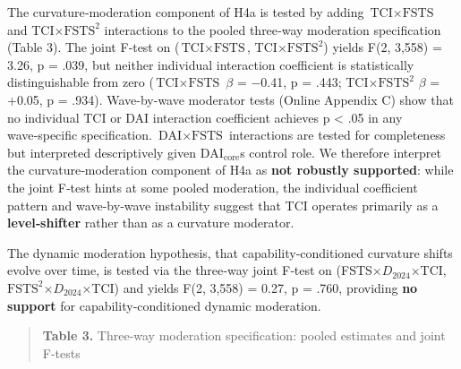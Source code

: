 \documentclass[12pt,a4paper]{article}
\begin{document}
The curvature‑moderation component of H4a is tested by adding
\(\text{TCI} \times \text{FSTS}\) and TCI\(\times\)\(\mathrm{FSTS}^2\)
interactions to the pooled three‑way moderation specification (Table 3).
The joint F‑test on (\(\text{TCI} \times \text{FSTS}\),
TCI\(\times\)\(\mathrm{FSTS}^2\)) yields F(2, 3,558) = 3.26, p = .039,
but neither individual interaction coefficient is statistically
distinguishable from zero (\(\text{TCI} \times \text{FSTS}\) \(\beta\) =
−0.41, p = .443; TCI\(\times\)\(\mathrm{FSTS}^2\) \(\beta\) = +0.05, p =
.934). Wave-by-wave moderator tests (Online Appendix C) show that no
individual TCI or DAI interaction coefficient achieves p \textless{} .05
in any wave‑specific specification. \(\text{DAI} \times \text{FSTS}\)
interactions are tested for completeness but interpreted descriptively
given \(\mathrm{DAI}_{\text{core}}\)\textquotesingle s control role. We
therefore interpret the curvature‑moderation component of H4a as
\textbf{not robustly supported}: while the joint F‑test hints at some
pooled moderation, the individual coefficient pattern and wave‑by‑wave
instability suggest that TCI operates primarily as a
\textbf{level‑shifter} rather than as a curvature moderator.

The dynamic moderation hypothesis, that capability‑conditioned curvature
shifts evolve over time, is tested via the three‑way joint F‑test on
(FSTS\(\times\)\(D_{2024}\)\(\times\)TCI,
\(\mathrm{FSTS}^2\)\(\times\)\(D_{2024}\)\(\times\)TCI) and yields F(2,
3,558) = 0.27, p = .760, providing \textbf{no support} for
capability‑conditioned dynamic moderation.

\begin{quote}
\textbf{Table 3.} Three-way moderation specification: pooled estimates
and joint F-tests
\end{quote}
\end{document}
